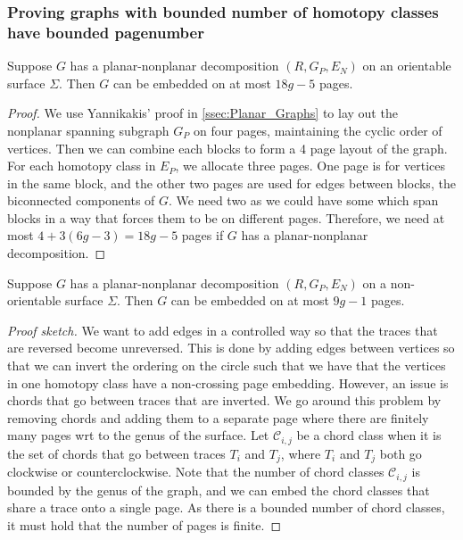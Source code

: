 \subsubsection{Proving graphs with bounded number of homotopy classes have bounded pagenumber}\label{sssec:bounded_pagenumber_homotopy}
\begin{lemma}\label{lem:planar_nonplanar_orientable}
	Suppose \(G\) has a planar-nonplanar decomposition \((R, G_P, E_N)\) on an orientable surface \(\Sigma\). Then \(G\) can be embedded on at most \(18g - 5\) pages.
\end{lemma}
\begin{proof}
	We use Yannikakis' proof in \cref{ssec:Planar_Graphs} to lay out the nonplanar spanning subgraph \(G_P\) on four pages, maintaining the cyclic order of vertices. Then we can combine each blocks to form a 4 page layout of the graph. For each homotopy class in \(E_P\), we allocate three pages. One page is for vertices in the same block, and the other two pages are used for edges between blocks, the biconnected components of \(G\). We need two as we could have some which span blocks in a way that forces them to be on different pages. Therefore, we need at most \(4 + 3(6g - 3) = 18g-5\) pages if \(G\) has a planar-nonplanar decomposition. 
\end{proof}

\begin{lemma}\label{lem:planar_nonplanar_nonorientable}
	Suppose \(G\) has a planar-nonplanar decomposition \((R, G_P, E_N)\) on a non-orientable surface \(\Sigma\). Then \(G\) can be embedded on at most \(9g - 1\) pages.
\end{lemma}
\begin{proof}[Proof sketch]
	We want to add edges in a controlled way so that the traces that are reversed become unreversed. This is done by adding edges between vertices so that we can invert the ordering on the circle such that we have that the vertices in one homotopy class have a non-crossing page embedding. However, an issue is chords that go between traces that are inverted. We go around this problem by removing chords and adding them to a separate page where there are finitely many pages wrt to the genus of the surface. Let \(\mathcal{C}_{i,j}\) be a chord class when it is the set of chords that go between traces \(T_i\) and \(T_j\), where \(T_i\) and \(T_j\) both go clockwise or counterclockwise. Note that the number of chord classes \(\mathcal{C}_{i,j}\) is bounded by the genus of the graph, and we can embed the chord classes that share a trace onto a single page. As there is a bounded number of chord classes, it must hold that the number of pages is finite. 
\end{proof}
